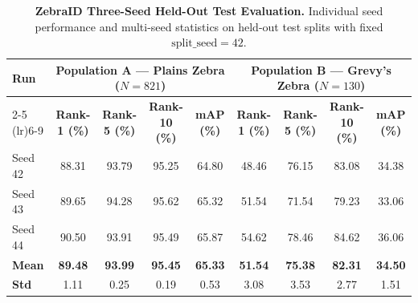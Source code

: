 \begin{table}[h]
\centering
\small
\caption{\textbf{ZebraID Three-Seed Held-Out Test Evaluation.} Individual seed performance and multi-seed statistics on held-out test splits with fixed $\text{split\_seed}=42$.}
\label{tab:zebraid_three_seed_test}
\begin{tabular}{lcccccccc}
\toprule
\multirow{2}{*}{\textbf{Run}} & \multicolumn{4}{c}{\textbf{Population A — Plains Zebra ($N=821$)}} & \multicolumn{4}{c}{\textbf{Population B — Grevy's Zebra ($N=130$)}} \\
\cmidrule(lr){2-5} \cmidrule(lr){6-9}
& \textbf{Rank-1 (\%)} & \textbf{Rank-5 (\%)} & \textbf{Rank-10 (\%)} & \textbf{mAP (\%)} & \textbf{Rank-1 (\%)} & \textbf{Rank-5 (\%)} & \textbf{Rank-10 (\%)} & \textbf{mAP (\%)} \\
\midrule
Seed 42 & 88.31 & 93.79 & 95.25 & 64.80 & 48.46 & 76.15 & 83.08 & 34.38 \\
Seed 43 & 89.65 & 94.28 & 95.62 & 65.32 & 51.54 & 71.54 & 79.23 & 33.06 \\
Seed 44 & 90.50 & 93.91 & 95.49 & 65.87 & 54.62 & 78.46 & 84.62 & 36.06 \\
\midrule
\textbf{Mean} & \textbf{89.48} & \textbf{93.99} & \textbf{95.45} & \textbf{65.33} & \textbf{51.54} & \textbf{75.38} & \textbf{82.31} & \textbf{34.50} \\
\textbf{Std}  & 1.11 & 0.25 & 0.19 & 0.53 & 3.08 & 3.53 & 2.77 & 1.51 \\
\bottomrule
\end{tabular}
\end{table}
